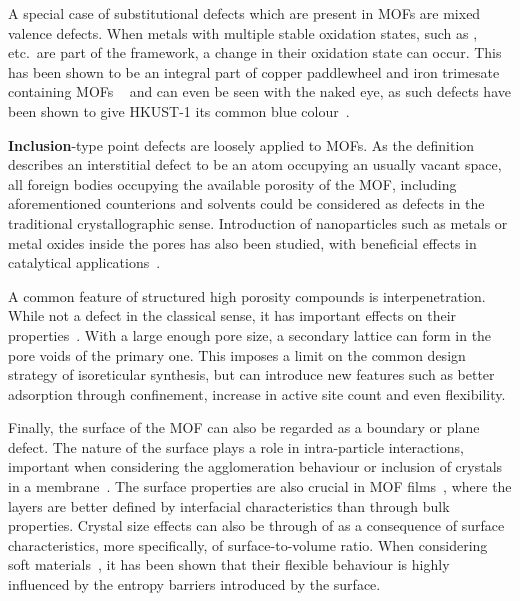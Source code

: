A special case of substitutional defects which are present in MOFs
are mixed valence defects. When metals with multiple stable oxidation
states, such as ,  etc.\ are part of
the framework, a change in their oxidation state can occur. This has
been shown to be an integral part of copper paddlewheel and
iron trimesate containing MOFs
~\cite{yoonControlledReducibilityMetalOrganic2010} and can even be
seen with the naked eye, as such defects have been shown
to give HKUST-1 its common blue colour~\cite{mullerDefectsColorCenters2017}.

\textbf{Inclusion}-type point defects are loosely applied to MOFs.
As the definition describes an interstitial defect
to be an atom occupying an usually vacant space, all foreign
bodies occupying the available porosity of the MOF, including
aforementioned counterions and solvents could be considered as
defects in the traditional crystallographic sense.
Introduction of nanoparticles such as metals or metal oxides
inside the pores has also been studied, with beneficial
effects in catalytical 
applications~\cite{falcaroApplicationMetalMetal2016}.

A common feature of structured high porosity compounds is
interpenetration. While not a defect in the classical sense,
it has important effects on their 
properties~\cite{haldarInterpenetrationCoordinationPolymers2015}.
With a large enough pore size, a secondary lattice can form in the
pore voids of the primary one. This imposes a limit on the
common design strategy of isoreticular synthesis, but can
introduce new features such as better adsorption through
confinement, increase in active site count and even flexibility.

Finally, the surface of the MOF can also be regarded as a
boundary or plane defect. The nature of the surface plays a role
in intra-particle interactions, important when considering
the agglomeration behaviour or inclusion of crystals in
a membrane~\cite{seminoMicroscopicModelMetal2016}.
The surface properties are also crucial in MOF 
films~\cite{gliemannEpitaxiallyGrownMetalorganic2012, %
	stassenUpdatedRoadmapIntegration2017}, where the layers
are better defined by interfacial characteristics
than through bulk properties.
Crystal size effects can also be through of as a consequence
of surface characteristics, more specifically, of surface-to-volume
ratio. When considering soft 
materials~\cite{krauseEffectCrystalliteSize2018, %
	vanduyfhuysThermodynamicInsightStimuliresponsive2018}, it has
been shown that their flexible behaviour is highly influenced
by the entropy barriers introduced by the surface.

